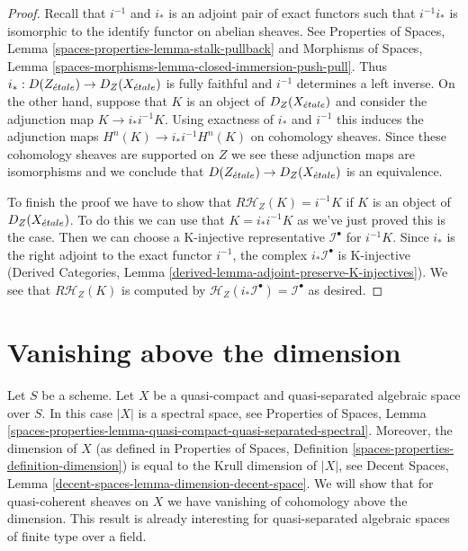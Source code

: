 \begin{proof}
Recall that $i^{-1}$ and $i_*$ is an adjoint pair of
exact functors such that $i^{-1}i_*$ is isomorphic to the identify
functor on abelian sheaves. See
Properties of Spaces, Lemma
\ref{spaces-properties-lemma-stalk-pullback} and
Morphisms of Spaces, Lemma
\ref{spaces-morphisms-lemma-closed-immersion-push-pull}.
Thus $i_* : D(Z_{\acute{e}tale}) \to D_Z(X_{\acute{e}tale})$ is fully faithful and
$i^{-1}$ determines
a left inverse. On the other hand, suppose that $K$ is an object of
$D_Z(X_{\acute{e}tale})$ and consider the adjunction map
$K \to i_*i^{-1}K$.
Using exactness of $i_*$ and $i^{-1}$
this induces the adjunction maps
$H^n(K) \to i_*i^{-1}H^n(K)$ on cohomology sheaves.
Since these cohomology
sheaves are supported on $Z$ we see these adjunction maps are isomorphisms
and we conclude that $D(Z_{\acute{e}tale}) \to D_Z(X_{\acute{e}tale})$ is an equivalence.

\medskip\noindent
To finish the proof we have to show that $R\mathcal{H}_Z(K) = i^{-1}K$
if $K$ is an object of $D_Z(X_{\acute{e}tale})$. To do this we can use that
$K = i_*i^{-1}K$
as we've just proved this is the case. Then we
can choose a K-injective representative $\mathcal{I}^\bullet$ for
$i^{-1}K$.
Since $i_*$ is the right adjoint to the exact functor
$i^{-1}$, the
complex $i_*\mathcal{I}^\bullet$ is K-injective
(Derived Categories, Lemma \ref{derived-lemma-adjoint-preserve-K-injectives}).
We see that $R\mathcal{H}_Z(K)$ is computed by
$\mathcal{H}_Z(i_*\mathcal{I}^\bullet) = \mathcal{I}^\bullet$
as desired.
\end{proof}






\section{Vanishing above the dimension}
\label{section-vanishing-above-dimension}

\noindent
Let $S$ be a scheme. Let $X$ be a quasi-compact and quasi-separated
algebraic space over $S$. In this case $|X|$ is a spectral space, see
Properties of Spaces, Lemma
\ref{spaces-properties-lemma-quasi-compact-quasi-separated-spectral}.
Moreover, the dimension of $X$ (as defined in
Properties of Spaces, Definition \ref{spaces-properties-definition-dimension})
is equal to the Krull dimension of $|X|$, see
Decent Spaces, Lemma \ref{decent-spaces-lemma-dimension-decent-space}.
We will show that for quasi-coherent sheaves on $X$ we have vanishing of
cohomology above the dimension. This result is already interesting for
quasi-separated algebraic spaces of finite type over a field.

